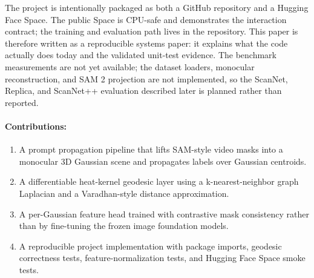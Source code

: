 \documentclass{article}
\begin{document}
The project is intentionally packaged as both a GitHub repository and a Hugging Face Space. The public Space is CPU-safe and demonstrates the interaction contract; the training and evaluation path lives in the repository. This paper is therefore written as a reproducible systems paper: it explains what the code actually does today and the validated unit-test evidence. The benchmark measurements are not yet available; the dataset loaders, monocular reconstruction, and SAM 2 projection are not implemented, so the ScanNet, Replica, and ScanNet++ evaluation described later is planned rather than reported.

\paragraph{Contributions:}
\begin{enumerate}
  \item A prompt propagation pipeline that lifts SAM-style video masks into a monocular 3D Gaussian scene and propagates labels over Gaussian centroids.
  \item A differentiable heat-kernel geodesic layer using a k-nearest-neighbor graph Laplacian and a Varadhan-style distance approximation.
  \item A per-Gaussian feature head trained with contrastive mask consistency rather than by fine-tuning the frozen image foundation models.
  \item A reproducible project implementation with package imports, geodesic correctness tests, feature-normalization tests, and Hugging Face Space smoke tests.
\end{enumerate}
\end{document}

